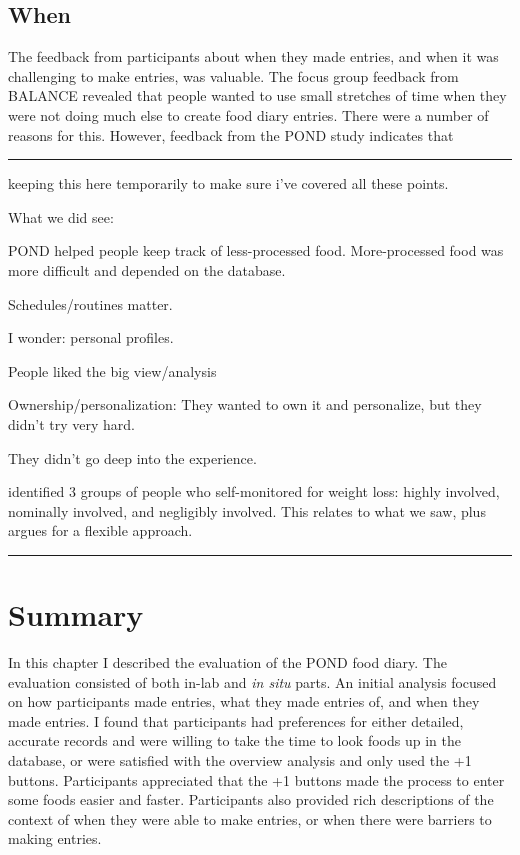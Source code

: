 \subsection{When}
The feedback from participants about when they made entries, and when it was challenging to make entries, was valuable. The focus group feedback from BALANCE revealed that people wanted to use small stretches of time when they were not doing much else to create food diary entries. There were a number of reasons for this. However, feedback from the POND study indicates that 

\vspace{1cm}
\hrule
keeping this here temporarily to make sure i've covered all these points. 

What we did see: 
\begin{itemize*}
\item POND helped people keep track of less-processed food. More-processed food was more difficult and depended on the database. 
\item Schedules/routines matter. 
\item I wonder: personal profiles. 
\item People liked the big view/analysis
\item Ownership/personalization: They wanted to own it and personalize, but they didn't try very hard. 
\item They didn't go deep into the experience. 
\item \citep{burke_experiences_2009} identified 3 groups of people who self-monitored for weight loss: highly involved, nominally involved, and negligibly involved. This relates to what we saw, plus argues for a flexible approach. 
\end{itemize*}
\hrule
\vspace{1cm}

\section{Summary}
In this chapter I described the evaluation of the POND food diary. The evaluation consisted of both in-lab and \textit{in situ} parts. An initial analysis focused on how participants made entries, what they made entries of, and when they made entries. I found that participants had preferences for either detailed, accurate records and were willing to take the time to look foods up in the database, or were satisfied with the overview analysis and only used the +1 buttons. Participants appreciated that the +1 buttons made the process to enter some foods easier and faster. Participants also provided rich descriptions of the context of when they were able to make entries, or when there were barriers to making entries. 
